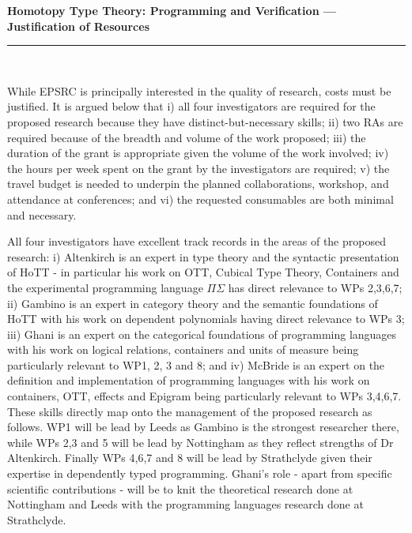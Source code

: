 \documentclass[a4paper,11pt]{article}
\begin{document}
\thispagestyle{plain}
\begin{center}
  {\Large \bf Homotopy Type Theory: Programming and Verification ---
  Justification of Resources}\\[1ex]

\vspace*{-0.1in}

\rule{160mm}{.5mm}\\[2ex]
\end{center}

\noindent While EPSRC is principally interested in the quality of research,
costs must be justified. It is argued below that i) all four investigators
are required for the proposed research because they have
distinct-but-necessary skills; ii) two RAs are required because of the
breadth and volume of the work proposed; iii) the duration of the
grant is appropriate given the volume of the work involved; iv) the
hours per week spent on the grant by the investigators are required;
v) the travel budget is needed to underpin the planned collaborations,
workshop, and attendance at conferences; and vi) the requested
consumables are both minimal and necessary.

\vspace{0.02in}

 All four investigators have
excellent track records in the areas of the proposed research: i)
Altenkirch is an expert in type theory and the syntactic presentation
of HoTT - in particular his work on OTT, Cubical Type Theory,
Containers and the experimental programming language $\Pi\Sigma$ has
direct relevance to WPs 2,3,6,7; ii) Gambino is an expert in category
theory and the semantic foundations of HoTT with his work on dependent
polynomials having direct relevance to WPs 3; iii) Ghani
is an expert on the categorical foundations of programming languages
with his work on logical relations, containers and units of measure
being particularly relevant to WP1, 2, 3 and 8; and iv) McBride is an
expert on the definition and implementation of programming languages
with his work on containers, OTT, effects and Epigram being
particularly relevant to WPs 3,4,6,7. These skills directly
map onto the management of the proposed research as follows. WP1 will
be lead by Leeds as Gambino is the strongest researcher there, while
WPs 2,3 and 5 will be lead by Nottingham as they reflect strengths of
Dr Altenkirch. Finally WPs 4,6,7 and 8 will be lead by Strathclyde
given their expertise in dependently typed programming. Ghani's role -
apart from specific scientific contributions - will be to knit the
theoretical research done at Nottingham and Leeds with the programming
languages research done at Strathclyde. 
\end{document}
